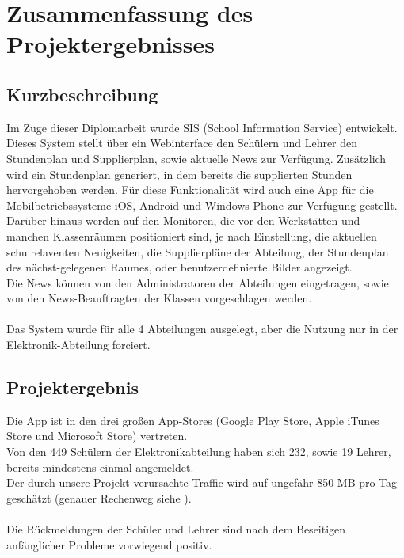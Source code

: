 \chapter[Zusammenfassung]{Zusammenfassung des Projektergebnisses}

\section{Kurzbeschreibung}
Im Zuge dieser Diplomarbeit wurde SIS (School Information Service) entwickelt. \\
Dieses System stellt über ein Webinterface den Schülern und Lehrer den Stundenplan und Supplierplan, sowie aktuelle News zur Verfügung. Zusätzlich wird ein Stundenplan generiert, in dem bereits die supplierten Stunden hervorgehoben werden.
Für diese Funktionalität wird auch eine App für die Mobilbetriebssysteme iOS, Android und Windows Phone zur Verfügung gestellt.\\
Darüber hinaus werden auf den Monitoren, die vor den Werkstätten und manchen Klassenräumen positioniert sind, je nach Einstellung, die aktuellen schulrelaventen Neuigkeiten, die Supplierpläne der Abteilung, der Stundenplan des nächst-gelegenen Raumes, oder benutzerdefinierte Bilder angezeigt.\\
Die News können von den Administratoren der Abteilungen eingetragen, sowie von den News-Beauftragten der Klassen vorgeschlagen werden.\\
\\
Das System wurde für alle 4 Abteilungen ausgelegt, aber die Nutzung nur in der Elektronik-Abteilung forciert.

\section{Projektergebnis}
Die App ist in den drei großen App-Stores (Google Play Store, Apple iTunes Store und Microsoft Store) vertreten.\\
Von den 449 Schülern der Elektronikabteilung haben sich 232, sowie 19 Lehrer, bereits mindestens einmal angemeldet. \\
Der durch unsere Projekt verursachte Traffic wird auf ungefähr 850 MB pro Tag geschätzt (genauer Rechenweg siehe ).\\
\\
Die Rückmeldungen der Schüler und Lehrer sind nach dem Beseitigen anfänglicher Probleme vorwiegend positiv.